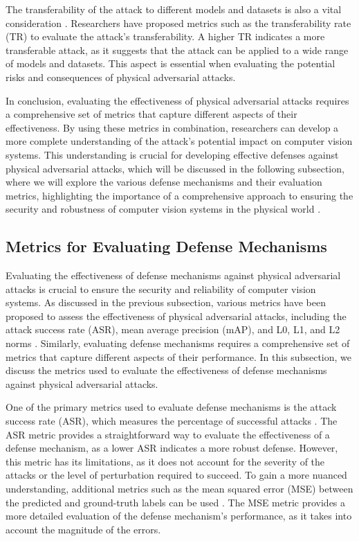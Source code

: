 \documentclass[11pt]{article}
\begin{document}
The transferability of the attack to different models and datasets is also a vital consideration \cite{ref106}. Researchers have proposed metrics such as the transferability rate (TR) to evaluate the attack's transferability. A higher TR indicates a more transferable attack, as it suggests that the attack can be applied to a wide range of models and datasets. This aspect is essential when evaluating the potential risks and consequences of physical adversarial attacks.

In conclusion, evaluating the effectiveness of physical adversarial attacks requires a comprehensive set of metrics that capture different aspects of their effectiveness. By using these metrics in combination, researchers can develop a more complete understanding of the attack's potential impact on computer vision systems. This understanding is crucial for developing effective defenses against physical adversarial attacks, which will be discussed in the following subsection, where we will explore the various defense mechanisms and their evaluation metrics, highlighting the importance of a comprehensive approach to ensuring the security and robustness of computer vision systems in the physical world \cite{ref107}.

\subsection{Metrics for Evaluating Defense Mechanisms}

Evaluating the effectiveness of defense mechanisms against physical adversarial attacks is crucial to ensure the security and reliability of computer vision systems. As discussed in the previous subsection, various metrics have been proposed to assess the effectiveness of physical adversarial attacks, including the attack success rate (ASR), mean average precision (mAP), and L0, L1, and L2 norms \cite{ref102}. Similarly, evaluating defense mechanisms requires a comprehensive set of metrics that capture different aspects of their performance. In this subsection, we discuss the metrics used to evaluate the effectiveness of defense mechanisms against physical adversarial attacks.

One of the primary metrics used to evaluate defense mechanisms is the attack success rate (ASR), which measures the percentage of successful attacks \cite{ref107}. The ASR metric provides a straightforward way to evaluate the effectiveness of a defense mechanism, as a lower ASR indicates a more robust defense. However, this metric has its limitations, as it does not account for the severity of the attacks or the level of perturbation required to succeed. To gain a more nuanced understanding, additional metrics such as the mean squared error (MSE) between the predicted and ground-truth labels can be used \cite{ref108}. The MSE metric provides a more detailed evaluation of the defense mechanism's performance, as it takes into account the magnitude of the errors.
\end{document}

